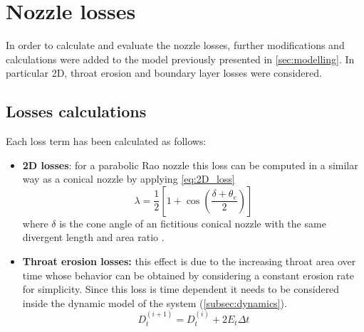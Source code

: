 \section{Nozzle losses}
\label{sec:nozzle_losses}

In order to calculate and evaluate the nozzle losses, further modifications and calculations were added to the model previously presented in \autoref{sec:modelling}.
In particular 2D, throat erosion and boundary layer losses were considered.

\subsection{Losses calculations}  

Each loss term has been calculated as follows:
\begin{itemize}
    \item \textbf{2D losses}: for a parabolic Rao nozzle this loss can be computed in a similar way as a conical nozzle by applying \autoref{eq:2D_loss}
    \begin{equation}
        \lambda = \frac{1}{2} \left[ 1 + \cos \left( \frac{\delta + \theta_e}{2}\right)\right]
        \label{eq:2D_loss}
    \end{equation}
    where $\delta$ is the cone angle of an fictitious conical nozzle with the same divergent length and area ratio \cite{Sutton}.
    \item \textbf{Throat erosion losses:} this effect is due to the increasing throat area over time whose behavior can be obtained by considering a constant erosion rate for simplicity. Since this loss is time dependent it needs to be considered inside the dynamic model of the system (\autoref{subsec:dynamics}).
    \begin{equation}
        D_t^{(i+1)} = D_t^{(i)} + 2 E_t \Delta t
    \end{equation}


\end{itemize}
